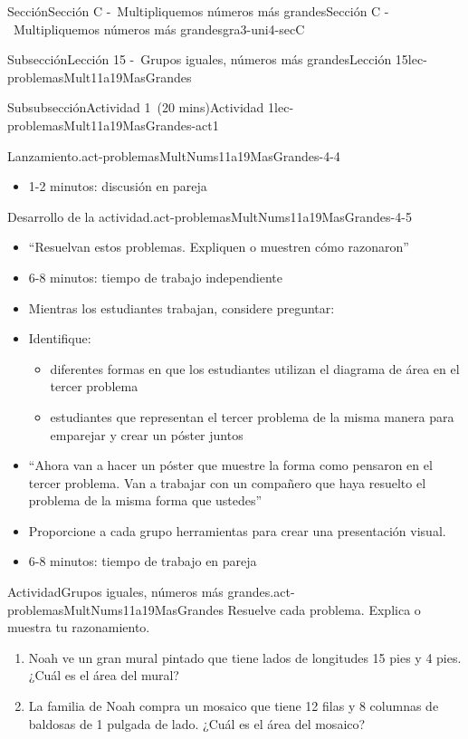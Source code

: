\documentclass[oneside,10pt,]{article}
\newlength{\fillinmaxwidth}
\newlength{\fillincontract}
\newlength{\charmaxwidth}\setlength{\charmaxwidth}{0.5em}
\newlength{\charminwidth}\setlength{\charminwidth}{0.1em}
\newlength{\fillinheight}
\newcommand{\fillintext}[1]{%
\setlength{\fillinmaxwidth}{#1\charmaxwidth}%
\setlength{\fillincontract}{#1\charminwidth}%
\setlength{\fillinheight}{\baselineskip}\addtolength{\fillinheight}{1.2pt}%
\strut\nobreak\leaders\vbox{\hrule width 0.3pt height 0.3pt \vskip -1.2pt}\hskip 1\fillinmaxwidth minus \fillincontract\nobreak\strut%
}
\begin{document}
\begin{sectionptx}{Sección}{Sección C -~Multipliquemos números más grandes}{}{Sección C -~Multipliquemos números más grandes}{}{}{gra3-uni4-secC}
\begin{subsectionptx}{Subsección}{Lección 15 -~Grupos iguales, números más grandes}{}{Lección 15}{}{}{lec-problemasMult11a19MasGrandes}
\begin{subsubsectionptx}{Subsubsección}{Actividad 1~(20 mins)}{}{Actividad 1}{}{}{lec-problemasMult11a19MasGrandes-act1}
\begin{paragraphs}{Lanzamiento.}{act-problemasMultNums11a19MasGrandes-4-4}
\begin{itemize}[label=\textbullet]
\item{}1-2 minutos: discusión en pareja%
\end{itemize}
\end{paragraphs}%
\begin{paragraphs}{Desarrollo de la actividad.}{act-problemasMultNums11a19MasGrandes-4-5}%
%
\begin{itemize}[label=\textbullet]
\item{}``Resuelvan estos problemas. Expliquen o muestren cómo razonaron''%
\item{}6-8 minutos: tiempo de trabajo independiente%
\item{}Mientras los estudiantes trabajan, considere preguntar:%
%
\item{}Identifique:%
%
\begin{itemize}[label=$\circ$]
\item{}diferentes formas en que los estudiantes utilizan el diagrama de área en el tercer problema%
\item{}estudiantes que representan el tercer problema de la misma manera para emparejar y crear un póster juntos%
\end{itemize}
\item{}``Ahora van a hacer un póster que muestre la forma como pensaron en el tercer problema. Van a trabajar con un compañero que haya resuelto el problema de la misma forma que ustedes''%
\item{}Proporcione a cada grupo herramientas para crear una presentación visual.%
\item{}6-8 minutos: tiempo de trabajo en pareja%
\end{itemize}
\end{paragraphs}%
\begin{activity}{Actividad}{Grupos iguales, números más grandes.}{act-problemasMultNums11a19MasGrandes}%
Resuelve cada problema. Explica o muestra tu razonamiento.%
%
\begin{enumerate}
\item{}Noah ve un gran mural pintado que tiene lados de longitudes 15 pies y 4 pies. ¿Cuál es el área del mural?%
\item{}La familia de Noah compra un mosaico que tiene 12 filas y 8 columnas de baldosas de 1 pulgada de lado. ¿Cuál es el área del mosaico?%

\end{enumerate}
\end{activity}
\end{subsubsectionptx}
\end{subsectionptx}
\end{sectionptx}
\end{document}
